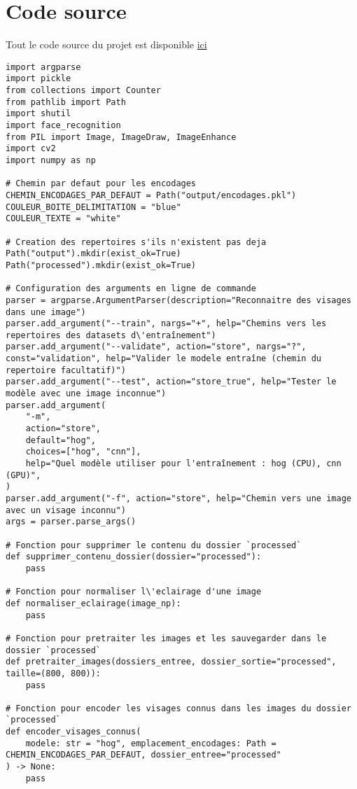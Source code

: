 \documentclass[a4paper,12pt]{report}
\begin{document}
\section{Code source}
Tout le code source du projet est disponible \href{https://github.com/fkobon/hina_eye}{ici} \newline
\begin{lstlisting}[caption={Extrait du code source du projet}]
import argparse
import pickle
from collections import Counter
from pathlib import Path
import shutil
import face_recognition
from PIL import Image, ImageDraw, ImageEnhance
import cv2
import numpy as np

# Chemin par defaut pour les encodages
CHEMIN_ENCODAGES_PAR_DEFAUT = Path("output/encodages.pkl")
COULEUR_BOITE_DELIMITATION = "blue"
COULEUR_TEXTE = "white"

# Creation des repertoires s'ils n'existent pas deja
Path("output").mkdir(exist_ok=True)
Path("processed").mkdir(exist_ok=True)

# Configuration des arguments en ligne de commande
parser = argparse.ArgumentParser(description="Reconnaitre des visages dans une image")
parser.add_argument("--train", nargs="+", help="Chemins vers les repertoires des datasets d\'entraînement")
parser.add_argument("--validate", action="store", nargs="?", const="validation", help="Valider le modele entraîne (chemin du repertoire facultatif)")
parser.add_argument("--test", action="store_true", help="Tester le modèle avec une image inconnue")
parser.add_argument(
    "-m",
    action="store",
    default="hog",
    choices=["hog", "cnn"],
    help="Quel modèle utiliser pour l'entraînement : hog (CPU), cnn (GPU)",
)
parser.add_argument("-f", action="store", help="Chemin vers une image avec un visage inconnu")
args = parser.parse_args()

# Fonction pour supprimer le contenu du dossier `processed`
def supprimer_contenu_dossier(dossier="processed"):
    pass

# Fonction pour normaliser l\'eclairage d'une image
def normaliser_eclairage(image_np):
    pass

# Fonction pour pretraiter les images et les sauvegarder dans le dossier `processed`
def pretraiter_images(dossiers_entree, dossier_sortie="processed", taille=(800, 800)):
    pass

# Fonction pour encoder les visages connus dans les images du dossier `processed`
def encoder_visages_connus(
    modele: str = "hog", emplacement_encodages: Path = CHEMIN_ENCODAGES_PAR_DEFAUT, dossier_entree="processed"
) -> None:
    pass


\end{lstlisting}
\end{document}
